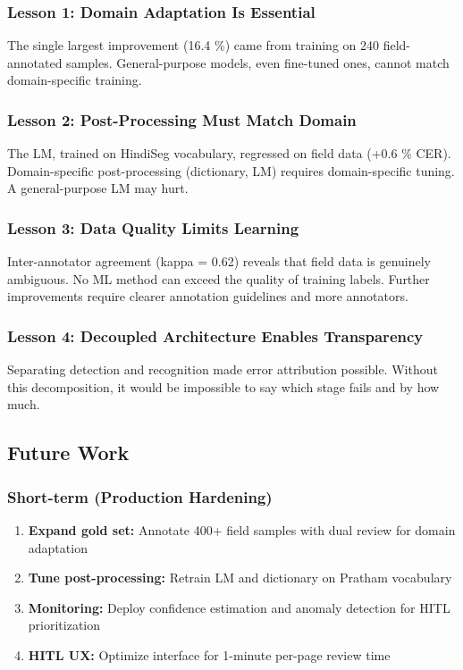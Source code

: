 \documentclass[14pt,a4paper]{article}
\begin{document}
\subsubsection{Lesson 1: Domain Adaptation Is Essential}

The single largest improvement (16.4 \%) came from training on 240 field-annotated samples. General-purpose models, even fine-tuned ones, cannot match domain-specific training.

\subsubsection{Lesson 2: Post-Processing Must Match Domain}

The LM, trained on HindiSeg vocabulary, regressed on field data (+0.6 \% CER). Domain-specific post-processing (dictionary, LM) requires domain-specific tuning. A general-purpose LM may hurt.

\subsubsection{Lesson 3: Data Quality Limits Learning}

Inter-annotator agreement (kappa = 0.62) reveals that field data is genuinely ambiguous. No ML method can exceed the quality of training labels. Further improvements require clearer annotation guidelines and more annotators.

\subsubsection{Lesson 4: Decoupled Architecture Enables Transparency}

Separating detection and recognition made error attribution possible. Without this decomposition, it would be impossible to say which stage fails and by how much.

\subsection{Future Work}

\subsubsection{Short-term (Production Hardening)}

\begin{enumerate}
    \item \textbf{Expand gold set:} Annotate 400+ field samples with dual review for domain adaptation
    \item \textbf{Tune post-processing:} Retrain LM and dictionary on Pratham vocabulary
    \item \textbf{Monitoring:} Deploy confidence estimation and anomaly detection for HITL prioritization
    \item \textbf{HITL UX:} Optimize interface for 1-minute per-page review time
\end{enumerate}
\end{document}
